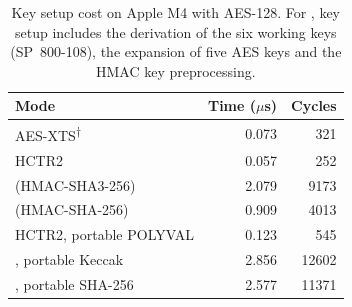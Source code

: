 \begin{table}[t]
\centering
\caption{Key setup cost on Apple M4 with AES-128. For \Scheme{}, key setup includes the derivation of the six working keys (SP~800-108), the expansion of five AES keys and the HMAC key preprocessing.}
\label{tab:keysetup}
\begin{tabular}{lrr}
\toprule
Mode & Time ($\mu$s) & Cycles \\
\midrule
AES-XTS\textsuperscript{$\dagger$} & 0.073 & 321 \\
HCTR2 & 0.057 & 252 \\
\Scheme{} (HMAC-SHA3-256) & 2.079 & 9173 \\
\Scheme{} (HMAC-SHA-256) & 0.909 & 4013 \\
HCTR2, portable POLYVAL & 0.123 & 545 \\
\Scheme{}, portable Keccak & 2.856 & 12602 \\
\Scheme{}, portable SHA-256 & 2.577 & 11371 \\
\bottomrule
\end{tabular}
\end{table}

